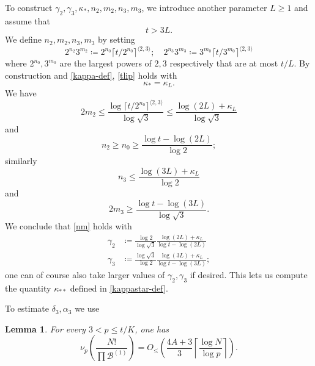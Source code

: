 \documentclass[10pt,a4paper,reqno]{amsart}
\numberwithin{equation}{section}
\theoremstyle{plain}
\newtheorem{lemma}[lemma]{Lemma}
\theoremstyle{definition}
\newcommand\tuple{{\mathcal B}}
\begin{document}
To construct $\gamma_2, \gamma_3, \kappa_*, n_2, m_2, n_3, m_3$, we introduce another parameter $L \geq 1$ and assume that
\begin{equation}\label{t-lower}
  t > 3L.
\end{equation}
We define $n_2,m_2,n_3,m_3$ by setting
$$
2^{n_2} 3^{m_2} \coloneqq 2^{n_0} \lceil t/2^{n_0} \rceil^{\langle 2,3 \rangle}; \quad
2^{n_3} 3^{m_3} \coloneqq 3^{m_0} \lceil t/3^{m_0} \rceil^{\langle 2,3 \rangle}$$
where $2^{n_0}, 3^{m_0}$ are the largest powers of $2,3$ respectively that are at most $t/L$.  By construction and \eqref{kappa-def}, \eqref{tlip} holds with
\begin{equation}\label{kappas-eq}
  \kappa_* = \kappa_L.
\end{equation}
We have
$$  2m_2 \leq \frac{\log \lceil t/2^{n_0} \rceil^{\langle 2,3 \rangle}}{\log \sqrt{3}}  \leq \frac{\log(2L) + \kappa_L}{\log \sqrt{3}}
$$
and
$$n_2 \geq n_0 \geq \frac{\log t - \log(2L)}{\log 2};$$
similarly
$$ n_3 \leq \frac{\log(3L)+\kappa_L}{\log 2}$$
and
$$ 2m_3 \geq \frac{\log t - \log(3L)}{\log \sqrt{3}}.$$
We conclude that \eqref{nm} holds with
\begin{equation}\label{gammas-def}
\begin{split}
\gamma_2 &\coloneqq \frac{\log 2}{\log \sqrt{3}} \frac{\log(2L) + \kappa_L}{\log t - \log(2L)} \\
\gamma_3 &\coloneqq \frac{\log \sqrt{3}}{\log 2} \frac{\log(3L) + \kappa_L}{\log t - \log(3L)};
\end{split}
\end{equation}
one can of course also take larger values of $\gamma_2,\gamma_3$ if desired.
This lets us compute the quantity $\kappa_{**}$ defined in \eqref{kappastar-def}.

To estimate $\delta_3, \alpha_3$ we use

\begin{lemma}\label{val-bound} For every $3 < p \leq t/K$, one has
\begin{equation}\label{nup}
  \nu_p\left(\frac{N!}{\prod \tuple^{(1)}}\right) =
O_{\leq}\left(\frac{4A+3}{3} \left\lceil \frac{\log N}{\log p}  \right\rceil\right).
\end{equation}
\end{lemma}
\end{document}
